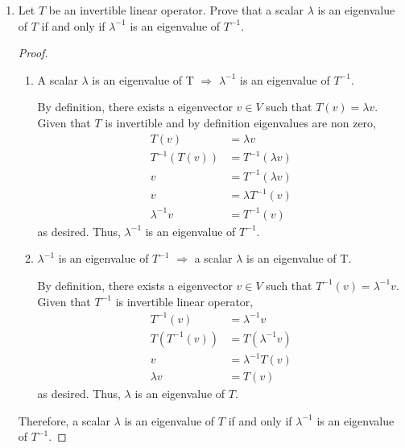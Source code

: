 \documentclass[11pt]{scrartcl}
\begin{document}
\begin{enumerate}[label=\alph*.]
{	      }
	\item{
	      Let $T$ be an invertible linear operator. Prove that a scalar $\lambda$ is an eigenvalue of $T$ if and only if
	      $\lambda^{-1}$ is an eigenvalue of $T^{-1}$.
	      \begin{proof}\
		      \begin{enumerate}[label=\roman*.]
			      \item{
			            A scalar $\lambda$ is an eigenvalue of T $\Rightarrow$ $\lambda^{-1}$ is an eigenvalue of $T^{-1}$.\par
			            By definition, there exists a eigenvector $v \in V$ such that $T(v) = \lambda v$. Given that $T$ is invertible
			            and by definition eigenvalues are non zero,
			            \begin{align*}
				            T(v)          & = \lambda v         \\
				            T^{-1}(T(v))  & = T^{-1}(\lambda v) \\
				            v             & = T^{-1}(\lambda v) \\
				            v             & = \lambda T^{-1}(v) \\
				            \lambda^{-1}v & =  T^{-1}(v)
			            \end{align*}
			            as desired. Thus, $\lambda^{-1}$ is an eigenvalue of $T^{-1}$.
			            }
			      \item{
			            $\lambda^{-1}$ is an eigenvalue of $T^{-1}$ $\Rightarrow$  a scalar $\lambda$ is an eigenvalue of T.\par
			            By definition, there exists a eigenvector $v \in V$ such that $T^{-1}(v) = \lambda^{-1} v$.
			            Given that $T^{-1}$ is invertible linear operator,
			            \begin{align*}
				            T^{-1}(v)    & = \lambda^{-1} v    \\
				            T(T^{-1}(v)) & = T(\lambda^{-1} v) \\
				            v            & = \lambda^{-1}T(v)  \\
				            \lambda v    & = T(v)
			            \end{align*}
			            as desired. Thus, $\lambda$ is an eigenvalue of $T$.
			            }
		      \end{enumerate}
		      Therefore, a scalar $\lambda$ is an eigenvalue of $T$ if and only if
		      $\lambda^{-1}$ is an eigenvalue of $T^{-1}$.
	      \end{proof}
}
\end{enumerate}
\end{document}
